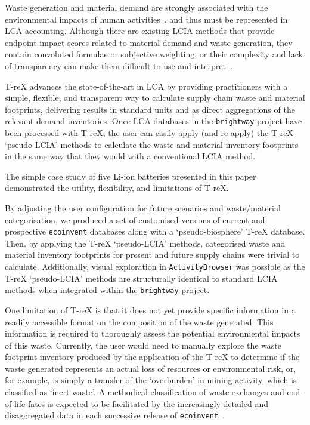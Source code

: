 Waste generation and material demand are strongly associated with the environmental impacts of human activities~\citep{laurenti2023wastefootprint,steinmann2017resourcefootprints, demirer2019wastefootprint}, and thus must be represented in LCA accounting. Although there are existing LCIA methods that provide endpoint impact scores related to material demand and waste generation, they contain convoluted formulae or subjective weighting, or their complexity and lack of transparency can make them difficult to use and interpret~\citep{foen2021ecofactors,hauschild2003edip,cen2019en15804, arvidsson2020csi,foen2021ecofactors}.

T-reX advances the state-of-the-art in LCA by providing practitioners with a simple, flexible, and transparent way to calculate supply chain waste and material footprints, delivering results in standard units and as direct aggregations of the relevant demand inventories. Once LCA databases in the \texttt{brightway} project have been processed with T-reX, the user can easily apply (and re-apply) the T-reX `pseudo-LCIA' methods to calculate the waste and material inventory footprints in the same way that they would with a conventional LCIA method.

The simple case study of five Li-ion batteries presented in this paper demonstrated the utility, flexibility, and limitations of T-reX.

By adjusting the user configuration for future scenarios and waste/material categorisation, we produced a set of customised versions of current and prospective \texttt{ecoinvent} databases along with a `pseudo-biosphere' T-reX database. Then, by applying the T-reX `pseudo-LCIA' methods, categorised waste and material inventory footprints for present and future supply chains were trivial to calculate. Additionally, visual exploration in \texttt{ActivityBrowser} was possible as the T-reX `pseudo-LCIA' methods are structurally identical to standard LCIA methods when integrated within the \texttt{brightway} project.

One limitation of T-reX is that it does not yet provide specific information in a readily accessible format on the composition of the waste generated. This information is required to thoroughly assess the potential environmental impacts of this waste. Currently, the user would need to manually explore the waste footprint inventory produced by the application of the T-reX to determine if the waste generated represents an actual loss of resources or environmental risk, or, for example, is simply a transfer of the `overburden' in mining activity, which is classified as `inert waste'. A methodical classification of waste exchanges and end-of-life fates is expected to be facilitated by the increasingly detailed and disaggregated data in each successive release of \texttt{ecoinvent}~\citep{fitzgerald2023ecoinventdocumentation}.


